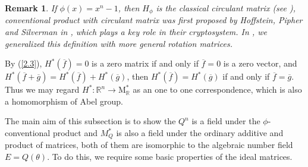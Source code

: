 \documentclass [11pt]{article}
\newtheorem{rem}[thm]{\bf Remark}
\begin{document}
 \begin{rem}\label{rm1}
 If $ \phi(x)=x^{n}-1$, then $H_{\phi}$ is the classical circulant matrix (see \cite{D-a}), conventional product with circulant matrix was first proposed by Hoffstein, Pipher and Silverman in \cite{H}, which  plays  a key role in their cryptosystem. In \cite{Z2},  we generalized this definition with more general rotation matrices.
  \end{rem}

  By (\ref{2.3}), $H^{*}(\overline{f})=0$ is a zero  matrix if and only if $\overline{f}=0$ is a zero vector, and $H^{*}(\overline{f}+\overline{g})=H^{*}(\overline{f})+H^{*}(\overline{g})$, then $H^{*}(\overline{f})=H^{*}(\overline{g})$ if and only if $\overline{f}=\overline{g}$. Thus we may regard $H^{*} :\mathbb{R}^{n} \rightarrow \mathrm{M}_{\mathbb{R}}^{*}$ as an one to one correspondence, which is also a homomorphism of Abel group.

The main aim of this subsection is to show the $Q^{n}$ is a field under the $\phi$-conventional product and $M_{Q}^{*}$ is also a
field under the ordinary additive and product of matrices, both of them are isomorphic to the algebraic number field $E=Q(\theta)$.
To do this, we require some basic properties of the ideal  matrices.
\end{document}
